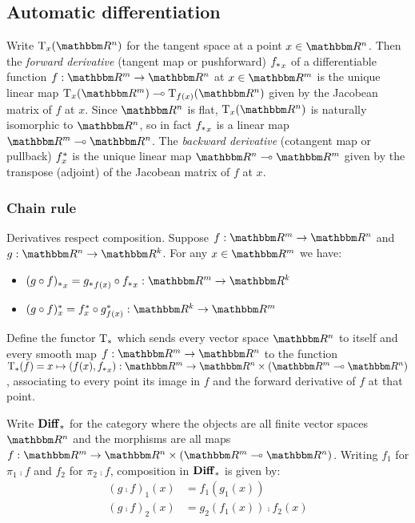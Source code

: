 \subsection{Automatic differentiation}

Write $\tangents_x(\RR^n)$ for the tangent space at a point $x \in \RR^n$. Then the \emph{forward derivative}
(tangent map or pushforward) ${f_{*}}_x$ of a differentiable function $f: \RR^m \to \RR^n$ at $x \in \RR^m$
is the unique linear map $\tangents_x(\RR^m) \linearto \tangents_{f(x)}(\RR^n)$ given by the Jacobean matrix
of $f$ at $x$. Since $\RR^n$ is flat, $\tangents_x(\RR^n)$ is naturally isomorphic to $\RR^n$, so in fact
${f_{*}}_x$ is a linear map $\RR^m \linearto \RR^n$. The \emph{backward derivative} (cotangent map or
pullback) $f^{*}_x$ is the unique linear map $\RR^n \linearto \RR^m$ given by the transpose (adjoint) of
the Jacobean matrix of $f$ at $x$.

\subsubsection{Chain rule}

Derivatives respect composition. Suppose $f: \RR^m \to \RR^n$ and $g: \RR^n \to \RR^k$. For any $x \in \RR^m$
we have:

\begin{itemize}
\item $\pushf{(g \comp f)}_x = \pushf{g}_{f(x)} \comp \pushf{f}_x: \RR^m \to \RR^k$
\item $\pullf{(g \comp f)}_x = \pullf{f}_{x} \comp \pullf{g}_{f(x)}: \RR^k \to \RR^m$
\end{itemize}

\begin{definition}
Define the functor $\mathrm{T}_*$ which sends every vector space $\RR^n$ to itself and every smooth map $f:
\RR^m \to \RR^n$ to the function $\tangents_*(f) = x \mapsto (f(x), \pushf{f}_x): \RR^m \to \RR^n \times (\RR^m
\linearto \RR^n)$, associating to every point its image in $f$ and the forward derivative of $f$ at that
point.
\end{definition}

\begin{definition}[$\Diff$]
\label{def:auto-diff:Diff}
Write $\mathbf{Diff}_*$ for the category where the objects are all finite vector spaces $\RR^n$ and the morphisms are
all maps $f: \RR^m \to \RR^n \times (\RR^m \linearto \RR^n)$. Writing $f_1$ for $\pi_1 \comp f$ and $f_2$ for
$\pi_2 \comp f$, composition in $\mathbf{Diff}_*$ is given by:
\begin{align*}
(g \comp f)_1(x) &= f_1(g_1(x)) \\
(g \comp f)_2(x) &= g_2(f_1(x)) \comp f_2(x)
\end{align*}
\end{definition}

